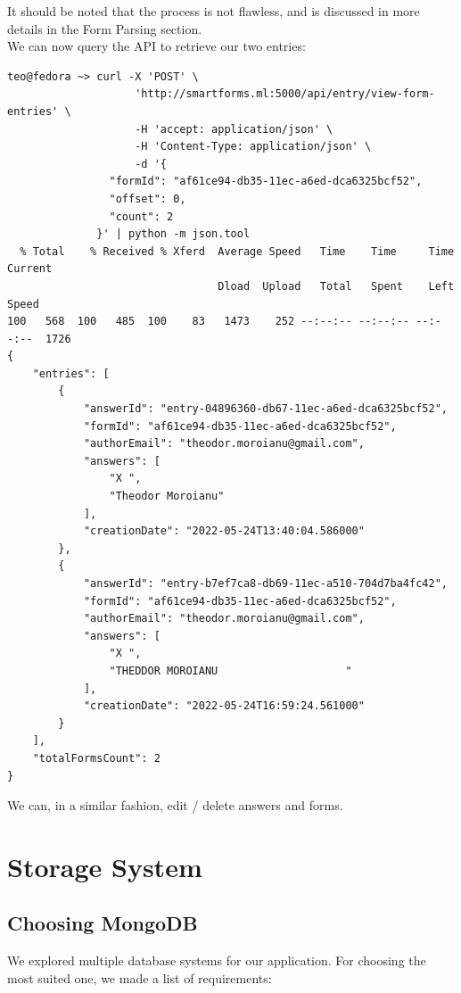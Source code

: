 \documentclass[11pt, a4paper]{report}
\begin{document}
It should be noted that the process is not flawless, and is discussed in more details in the Form Parsing section.
\\


We can now query the API to retrieve our two entries:

\begin{verbatim}
teo@fedora ~> curl -X 'POST' \
                    'http://smartforms.ml:5000/api/entry/view-form-entries' \
                    -H 'accept: application/json' \
                    -H 'Content-Type: application/json' \
                    -d '{
                "formId": "af61ce94-db35-11ec-a6ed-dca6325bcf52",
                "offset": 0,
                "count": 2
              }' | python -m json.tool
  % Total    % Received % Xferd  Average Speed   Time    Time     Time  Current
                                 Dload  Upload   Total   Spent    Left  Speed
100   568  100   485  100    83   1473    252 --:--:-- --:--:-- --:--:--  1726
{
    "entries": [
        {
            "answerId": "entry-04896360-db67-11ec-a6ed-dca6325bcf52",
            "formId": "af61ce94-db35-11ec-a6ed-dca6325bcf52",
            "authorEmail": "theodor.moroianu@gmail.com",
            "answers": [
                "X ",
                "Theodor Moroianu"
            ],
            "creationDate": "2022-05-24T13:40:04.586000"
        },
        {
            "answerId": "entry-b7ef7ca8-db69-11ec-a510-704d7ba4fc42",
            "formId": "af61ce94-db35-11ec-a6ed-dca6325bcf52",
            "authorEmail": "theodor.moroianu@gmail.com",
            "answers": [
                "X ",
                "THEDDOR MOROIANU                    "
            ],
            "creationDate": "2022-05-24T16:59:24.561000"
        }
    ],
    "totalFormsCount": 2
}
\end{verbatim}

We can, in a similar fashion, edit / delete answers and forms.


\chapter{Storage System}

\section{Choosing MongoDB}
We explored multiple database systems for our application. For choosing the most suited one, we made a list of requirements:
\end{document}
